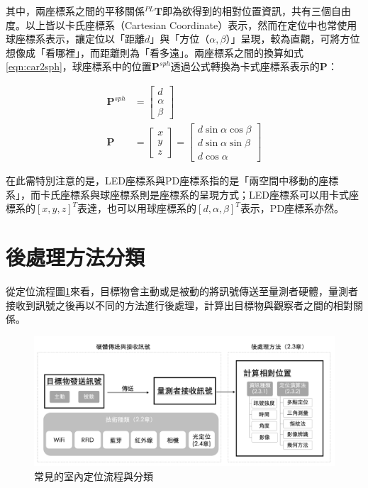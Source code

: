     
    
   其中，兩座標系之間的平移關係$^{PL}\boldsymbol{T}$即為欲得到的相對位置資訊，共有三個自由度。以上皆以卡氏座標系（Cartesian Coordinate）表示，然而在定位中也常使用球座標系表示，讓定位以「距離$d$」與「方位（$\alpha,\beta$）」呈現，較為直觀，可將方位想像成「看哪裡」，而距離則為「看多遠」。兩座標系之間的換算如式\ref{eqn:car2sph}，球座標系中的位置$\boldsymbol{P}^{sph}$透過公式轉換為卡式座標系表示的$\boldsymbol{P}$：

   \begin{equation}
    \label{eqn:car2sph}
        \begin{aligned}
        \boldsymbol{P}^{sph}&=\left[\begin{array}{c}
            d\\\alpha\\\beta
            \end{array}\right] \\  
        \boldsymbol{P} &= \left[\begin{array}{c}
            x\\y\\z
            \end{array}\right]=
            \left[\begin{array}{c}
            d\sin\alpha\cos\beta \\
            d\sin\alpha\sin\beta\\
            d\cos\alpha
            \end{array}\right] 
    \end{aligned}
   \end{equation}

   在此需特別注意的是，LED座標系與PD座標系指的是「兩空間中移動的座標系」，而卡氏座標系與球座標系則是座標系的呈現方式；LED座標系可以用卡式座標系的$[x,y,z]^T$表達，也可以用球座標系的$[d,\alpha,\beta]^T$表示，PD座標系亦然。



\section{後處理方法分類}
\label{chp:method}

    從定位流程圖\ref{pic:intro_pos}來看，目標物會主動或是被動的將訊號傳送至量測者硬體，量測者接收到訊號之後再以不同的方法進行後處理，計算出目標物與觀察者之間的相對關係。

    \begin{figure}[h]
        \centering
        \includegraphics[width=14cm]{ch1pic/intro_pos.png}
        \caption{常見的室內定位流程與分類}
        \label{pic:intro_pos}
    \end{figure}
    
